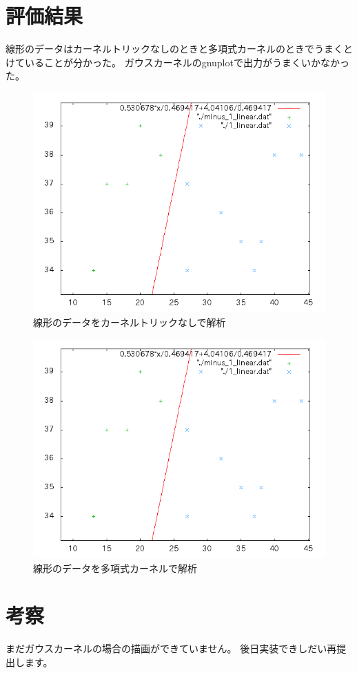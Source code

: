 \documentclass[a4paper,12pt]{jarticle}
\begin{document}
\section{評価結果}
線形のデータはカーネルトリックなしのときと多項式カーネルのときでうまくとけていることが分かった。
ガウスカーネルのgnuplotで出力がうまくいかなかった。
\begin{figure}[tp]
\includegraphics[scale=0.8]{linearNokernel.png}

\caption{線形のデータをカーネルトリックなしで解析}
\label{fig:sample}
\end{figure}



\begin{figure}[tp]
\includegraphics[scale=0.8]{linearPolinomical.png}

\caption{線形のデータを多項式カーネルで解析}
\label{fig:sample}
\end{figure}


\section{考察}
まだガウスカーネルの場合の描画ができていません。
後日実装できしだい再提出します。

\end{document}

